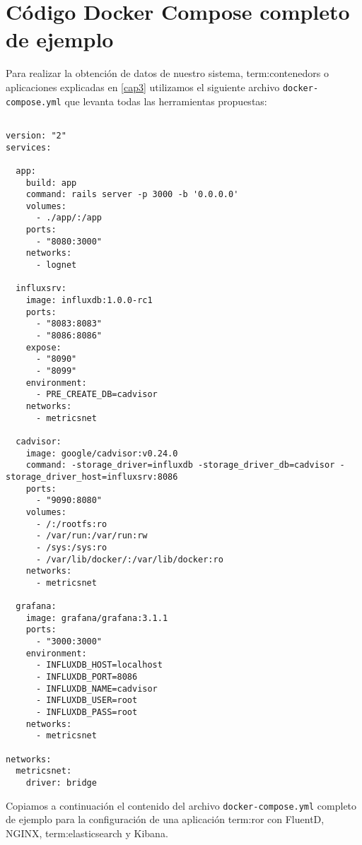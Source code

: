 \section{Código Docker Compose completo de ejemplo}
\label{anexo:C}

Para realizar la obtención de datos de nuestro sistema, \glspl{term:contenedor} o
aplicaciones explicadas en \autoref{cap3} utilizamos el siguiente archivo
\texttt{docker-compose.yml} que levanta todas las herramientas propuestas:

\begin{lstlisting}

version: "2"
services:

  app:
    build: app
    command: rails server -p 3000 -b '0.0.0.0'
    volumes:
      - ./app/:/app
    ports:
      - "8080:3000"
    networks:
      - lognet

  influxsrv:
    image: influxdb:1.0.0-rc1
    ports:
      - "8083:8083"
      - "8086:8086"
    expose:
      - "8090"
      - "8099"
    environment:
      - PRE_CREATE_DB=cadvisor
    networks:
      - metricsnet

  cadvisor:
    image: google/cadvisor:v0.24.0
    command: -storage_driver=influxdb -storage_driver_db=cadvisor -storage_driver_host=influxsrv:8086
    ports:
      - "9090:8080"
    volumes:
      - /:/rootfs:ro
      - /var/run:/var/run:rw
      - /sys:/sys:ro
      - /var/lib/docker/:/var/lib/docker:ro
    networks:
      - metricsnet

  grafana:
    image: grafana/grafana:3.1.1
    ports:
      - "3000:3000"
    environment:
      - INFLUXDB_HOST=localhost
      - INFLUXDB_PORT=8086
      - INFLUXDB_NAME=cadvisor
      - INFLUXDB_USER=root
      - INFLUXDB_PASS=root
    networks:
      - metricsnet

networks:
  metricsnet:
    driver: bridge

\end{lstlisting}

Copiamos a continuación el contenido del archivo \texttt{docker-compose.yml}
completo de ejemplo para la configuración de una aplicación \gls{term:ror} con FluentD,
NGINX, \gls{term:elasticsearch} y Kibana.

